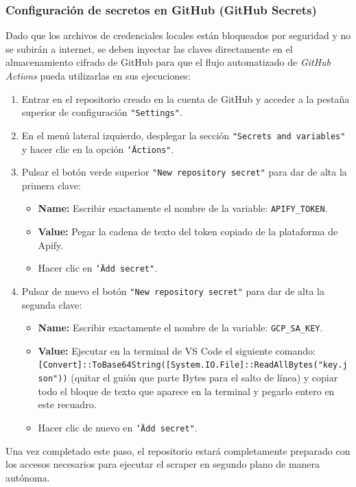 \subsubsection{Configuración de secretos en GitHub (GitHub Secrets)}
Dado que los archivos de credenciales locales están bloqueados por seguridad y no se subirán a internet, se deben inyectar las claves directamente en el almacenamiento cifrado de GitHub para que el flujo automatizado de \textit{GitHub Actions} pueda utilizarlas en sus ejecuciones:
\begin{enumerate}
    \item Entrar en el repositorio creado en la cuenta de GitHub y acceder a la pestaña superior de configuración \texttt{"Settings"}.
    \item En el menú lateral izquierdo, desplegar la sección \texttt{"Secrets and variables"} y hacer clic en la opción \texttt{\char`\"Actions"}.
    \item Pulsar el botón verde superior \texttt{"New repository secret"} para dar de alta la primera clave:
    \begin{itemize}
        \item \textbf{Name:} Escribir exactamente el nombre de la variable: \texttt{APIFY\_TOKEN}.
        \item \textbf{Value:} Pegar la cadena de texto del token copiado de la plataforma de Apify.
        \item Hacer clic en \texttt{\char`\"Add secret"}.
    \end{itemize}
    \item Pulsar de nuevo el botón \texttt{"New repository secret"} para dar de alta la segunda clave:
    \begin{itemize}
        \item \textbf{Name:} Escribir exactamente el nombre de la variable: \texttt{GCP\_SA\_KEY}.
        \item \textbf{Value:} Ejecutar en la terminal de VS Code el siguiente comando: \texttt{[Convert]::ToBase64String([System.IO.File]::ReadAllBy\-tes("key.json"))} (quitar el guión que parte Bytes para el salto de línea) y copiar todo el bloque de texto que aparece en la terminal y pegarlo entero en este recuadro.
        \item Hacer clic de nuevo en \texttt{\char`\"Add secret"}.
    \end{itemize}
\end{enumerate}
Una vez completado este paso, el repositorio estará completamente preparado con los accesos necesarios para ejecutar el scraper en segundo plano de manera autónoma.


